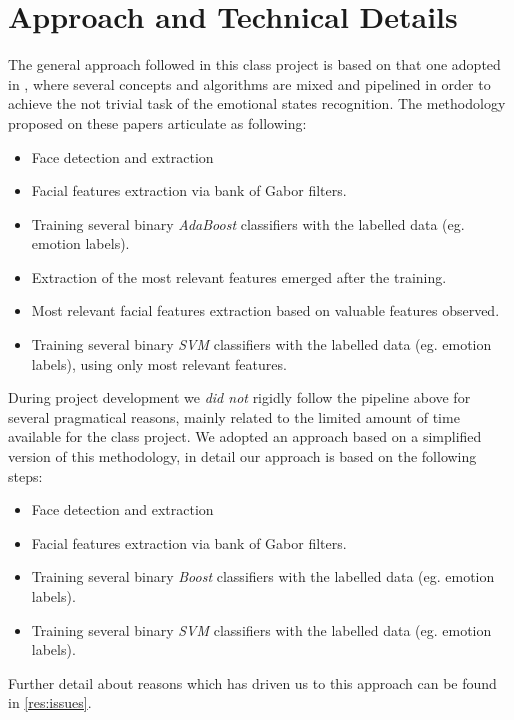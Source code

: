\section{Approach and Technical Details}

The general approach followed in this class project is based on that one adopted in \cite{Littlewort04dynamicsof,Bartlett06fullyautomatic}, where several concepts and algorithms are mixed and pipelined in order to achieve the not trivial task of the emotional states recognition. The methodology proposed on these papers articulate as following:

\begin{itemize}
\item Face detection and extraction
\item Facial features extraction via bank of Gabor filters.
\item Training several binary \emph{AdaBoost} classifiers with the labelled data (eg. emotion labels).
\item Extraction of the most relevant features emerged after the training.
\item Most relevant facial features extraction based on valuable features observed.
\item Training several binary \emph{SVM} classifiers with the labelled data (eg. emotion labels), using only most relevant features.
\end{itemize}

During project development we \emph{did not} rigidly follow the pipeline above for several pragmatical reasons, mainly related to the limited amount of time available for the class project. We adopted an approach based on a simplified version of this methodology, in detail our approach is based on the following steps:

\begin{itemize}
\item Face detection and extraction
\item Facial features extraction via bank of Gabor filters.
\item Training several binary \emph{Boost} classifiers with the labelled data (eg. emotion labels).
\item Training several binary \emph{SVM} classifiers with the labelled data (eg. emotion labels).
\end{itemize}

Further detail about reasons which has driven us to this approach can be found in \ref{res:issues}.\\

